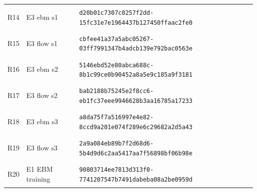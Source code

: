 \begin{longtable}{@{}l>{\raggedright\arraybackslash}p{3.5cm}p{10.8cm}@{}}
\hypertarget{R14}{R14} & E3 ebm s1 & {\fontsize{8.8}{11}\selectfont\texttt{d20b01c7307c0257f2dd-15fc31e7e1964437b127450ffaac2fe0}} \\
\hypertarget{R15}{R15} & E3 flow s1 & {\fontsize{8.8}{11}\selectfont\texttt{cbfee41a37a5abc05267-03ff7991347b4adcb139e792bac0563e}} \\
\hypertarget{R16}{R16} & E3 ebm s2 & {\fontsize{8.8}{11}\selectfont\texttt{5146ebd52e80abca688c-8b1c99ce0b90452a8a5e9c185a9f3181}} \\
\hypertarget{R17}{R17} & E3 flow s2 & {\fontsize{8.8}{11}\selectfont\texttt{bab2188b75245e2f8cc6-eb1fc37eee9946628b3aa16785a17233}} \\
\hypertarget{R18}{R18} & E3 ebm s3 & {\fontsize{8.8}{11}\selectfont\texttt{a8da75f7a516997e4e82-8ccd9a201e074f289e6c29682a2d5a43}} \\
\hypertarget{R19}{R19} & E3 flow s3 & {\fontsize{8.8}{11}\selectfont\texttt{2a9a084eb89b7f2d68d6-5b4d9d6c2aa5417aa7f56898bf06b98e}} \\
\hypertarget{R20}{R20} & E1 EBM training & {\fontsize{8.8}{11}\selectfont\texttt{90803714ee7813d313f0-7741207547b7491dabeba08a2be0959d}} \\
\bottomrule\end{longtable}\endgroup
